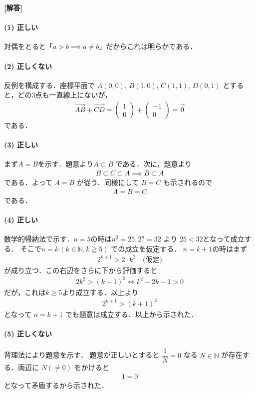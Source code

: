 \documentclass[../../main.tex]{subfiles}
\begin{document}
\begin{oframed}
  
\end{oframed}

{\bf [解答]}

\paragraph{(1) 正しい}

対偶をとると「$a > b \implies a \neq b$」だからこれは明らかである．

\paragraph{(2) 正しくない}

反例を構成する．座標平面で $A(0,0)$, $B(1,0)$, $C(1,1)$, $D(0,1)$ とすると，どの3点も一直線上にないが，
\begin{align}
  \overrightarrow{AB} + \overrightarrow{CD} =
  \begin{pmatrix} 1 \\ 0
  \end{pmatrix} +
  \begin{pmatrix} -1 \\ 0
  \end{pmatrix} = \vec{0}
\end{align}
である．

\paragraph{(3) 正しい}

まず$A=B$を示す．題意より$A \subset B$ である．次に，題意より
\begin{align}
  B \subset C \subset A \implies B \subset A
\end{align}
である．よって $A=B$ が従う．同様にして $B=C$ も示されるので
\begin{align}
  A=B=C
\end{align}
である．

\paragraph{(4) 正しい}

数学的帰納法で示す．$n=5$の時は$n^2=25, 2^n=32$ より $25 < 32$となって成立する．
そこで$n=k \, (k \in \mathbb{N}, k \geqq 5)$ での成立を仮定する．
$n=k+1$の時はまず
\begin{align}
  2^{k+1} > 2 \cdot k^2 \quad \text{(仮定)}
\end{align}
が成り立つ．この右辺をさらに下から評価すると
\begin{align}
  2k^2 > (k+1)^2
  \iff
  k^2-2k-1>0
\end{align}
だが，これは$k \ge 5$より成立する．以上より
\begin{align}
  2^{k+1} > (k+1)^2
\end{align}
となって $n=k+1$ でも題意は成立する．以上から示された．

\paragraph{(5) 正しくない}

背理法により題意を示す．
題意が正しいとすると $\dfrac{1}{N} = 0$ なる $N \in \mathbb{N}$ が存在する．両辺に $N (\neq 0)$ をかけると
\begin{align}
  1 = 0
\end{align}
となって矛盾するから示された．

\newpage
\end{document}
